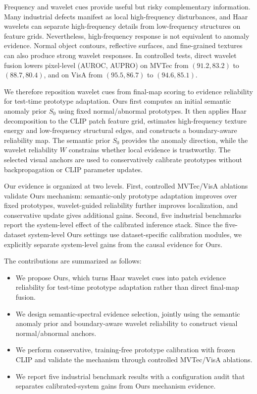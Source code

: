 \documentclass[runningheads]{llncs}
\begin{document}
Frequency and wavelet cues provide useful but risky complementary information. Many industrial defects manifest as local high-frequency disturbances, and Haar wavelets can separate high-frequency details from low-frequency structures on feature grids. Nevertheless, high-frequency response is not equivalent to anomaly evidence. Normal object contours, reflective surfaces, and fine-grained textures can also produce strong wavelet responses. In controlled tests, direct wavelet fusion lowers pixel-level (AUROC, AUPRO) on MVTec from $(91.2,83.2)$ to $(88.7,80.4)$, and on VisA from $(95.5,86.7)$ to $(94.6,85.1)$.

We therefore reposition wavelet cues from final-map scoring to evidence reliability for test-time prototype adaptation. Ours first computes an initial semantic anomaly prior $S_0$ using fixed normal/abnormal prototypes. It then applies Haar decomposition to the CLIP patch feature grid, estimates high-frequency texture energy and low-frequency structural edges, and constructs a boundary-aware reliability map. The semantic prior $S_0$ provides the anomaly direction, while the wavelet reliability $W$ constrains whether local evidence is trustworthy. The selected visual anchors are used to conservatively calibrate prototypes without backpropagation or CLIP parameter updates.

Our evidence is organized at two levels. First, controlled MVTec/VisA ablations validate Ours mechanism: semantic-only prototype adaptation improves over fixed prototypes, wavelet-guided reliability further improves localization, and conservative update gives additional gains. Second, five industrial benchmarks report the system-level effect of the calibrated inference stack. Since the five-dataset system-level Ours settings use dataset-specific calibration modules, we explicitly separate system-level gains from the causal evidence for Ours.

The contributions are summarized as follows:
\begin{itemize}
  \item We propose Ours, which turns Haar wavelet cues into patch evidence reliability for test-time prototype adaptation rather than direct final-map fusion.
  \item We design semantic-spectral evidence selection, jointly using the semantic anomaly prior and boundary-aware wavelet reliability to construct visual normal/abnormal anchors.
  \item We perform conservative, training-free prototype calibration with frozen CLIP and validate the mechanism through controlled MVTec/VisA ablations.
  \item We report five industrial benchmark results with a configuration audit that separates calibrated-system gains from Ours mechanism evidence.
\end{itemize}
\end{document}
